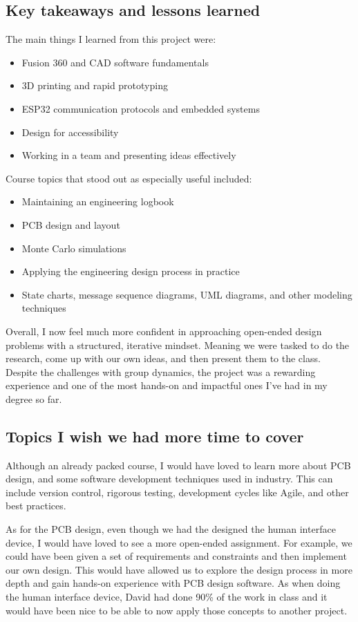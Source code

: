 \documentclass{article}
\begin{document}
\subsection{Key takeaways and lessons learned}

The main things I learned from this project were:
\begin{itemize}
    \item Fusion 360 and CAD software fundamentals
    \item 3D printing and rapid prototyping
    \item ESP32 communication protocols and embedded systems
    \item Design for accessibility
    \item Working in a team and presenting ideas effectively
\end{itemize}

Course topics that stood out as especially useful included:
\begin{itemize}
    \item Maintaining an engineering logbook
    \item PCB design and layout
    \item Monte Carlo simulations
    \item Applying the engineering design process in practice
    \item State charts, message sequence diagrams, UML diagrams, and other modeling techniques
\end{itemize}

Overall, I now feel much more confident in approaching open-ended design problems with a structured, iterative mindset. Meaning we were tasked to do the research, come up with our own ideas, and then present them to the class. Despite the challenges with group dynamics, the project was a rewarding experience and one of the most hands-on and impactful ones I've had in my degree so far.

\subsection{Topics I wish we had more time to cover}

Although an already packed course, I would have loved to learn more about PCB design, and some software development techniques used in industry. This can include version control, rigorous testing, development cycles like Agile, and other best practices.

As for the PCB design, even though we had the designed the human interface device, I would have loved to see a more open-ended assignment. For example, we could have been given a set of requirements and constraints and then implement our own design. This would have allowed us to explore the design process in more depth and gain hands-on experience with PCB design software. As when doing the human interface device, David had done 90\% of the work in class and it would have been nice to be able to now apply those concepts to another project.
\end{document}

